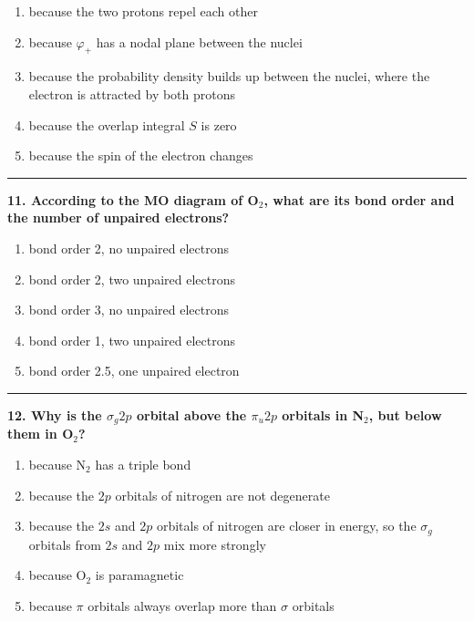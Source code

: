 \documentclass[
  english,
  9pt,
]{extbook}
\providecommand{\tightlist}{%
  \setlength{\itemsep}{0pt}\setlength{\parskip}{0pt}}
\theoremstyle{definition}
\theoremstyle{definition}
\theoremstyle{definition}
\theoremstyle{definition}
\theoremstyle{remark}
\begin{document}
\begin{enumerate}
\def\labelenumi{\alph{enumi}.}
\tightlist
\item
  because the two protons repel each other\\
\item
  because \(\varphi_+\) has a nodal plane between the nuclei\\
\item
  because the probability density builds up between the nuclei, where the electron is attracted by both protons\\
\item
  because the overlap integral \(S\) is zero\\
\item
  because the spin of the electron changes
\end{enumerate}

\begin{center}\rule{0.5\linewidth}{0.5pt}\end{center}

\textbf{11. According to the MO diagram of O\(_2\), what are its bond order and the number of unpaired electrons?}

\begin{enumerate}
\def\labelenumi{\alph{enumi}.}
\tightlist
\item
  bond order 2, no unpaired electrons\\
\item
  bond order 2, two unpaired electrons\\
\item
  bond order 3, no unpaired electrons\\
\item
  bond order 1, two unpaired electrons\\
\item
  bond order 2.5, one unpaired electron
\end{enumerate}

\begin{center}\rule{0.5\linewidth}{0.5pt}\end{center}

\textbf{12. Why is the \(\sigma_g 2p\) orbital above the \(\pi_u 2p\) orbitals in N\(_2\), but below them in O\(_2\)?}

\begin{enumerate}
\def\labelenumi{\alph{enumi}.}
\tightlist
\item
  because N\(_2\) has a triple bond\\
\item
  because the \(2p\) orbitals of nitrogen are not degenerate\\
\item
  because the \(2s\) and \(2p\) orbitals of nitrogen are closer in energy, so the \(\sigma_g\) orbitals from \(2s\) and \(2p\) mix more strongly\\
\item
  because O\(_2\) is paramagnetic\\
\item
  because \(\pi\) orbitals always overlap more than \(\sigma\) orbitals
\end{enumerate}
\end{document}
